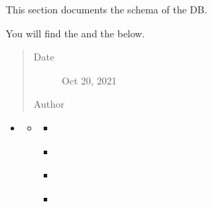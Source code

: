 \documentclass[letterpaper,10pt,english]{sphinxmanual}
\begin{document}
\begin{enumerate}
\begin{itemize}
\begin{sphinxShadowBox}
\sphinxAtStartPar
This section documents the schema of the DB.

\sphinxAtStartPar
You will find the {\hyperref[\detokenize{schema_tables:schema-definitions}]{}} and the {\hyperref[\detokenize{schema_tables:reference-tables}]{}} below.
\begin{quote}\begin{description}
\item[{Date}] \leavevmode
\sphinxAtStartPar
Oct 20, 2021

\item[{Author}] \leavevmode
\sphinxAtStartPar
{}

\end{description}\end{quote}
\end{sphinxShadowBox}

\begin{sphinxShadowBox}
\begin{itemize}
\item {} 
\sphinxAtStartPar
{}\label{\detokenize{schema_tables:id99}}{\hyperref[\detokenize{schema_tables:database-schema}]{}}
\begin{itemize}
\item {} 
\sphinxAtStartPar
{}\label{\detokenize{schema_tables:id100}}{\hyperref[\detokenize{schema_tables:schema-definitions}]{}}
\begin{itemize}
\item {} 
\sphinxAtStartPar
{}\label{\detokenize{schema_tables:id101}}{\hyperref[\detokenize{schema_tables:year}]{}}

\item {} 
\sphinxAtStartPar
{}\label{\detokenize{schema_tables:id102}}{\hyperref[\detokenize{schema_tables:aggressor-id}]{}}

\item {} 
\sphinxAtStartPar
{}\label{\detokenize{schema_tables:id103}}{\hyperref[\detokenize{schema_tables:aggressor-name}]{}}

\item {} 
\sphinxAtStartPar
{}\label{\detokenize{schema_tables:id104}}{\hyperref[\detokenize{schema_tables:victim-id}]{}}


\end{itemize}
\end{itemize}
\end{itemize}
\end{sphinxShadowBox}
\end{itemize}
\end{enumerate}
\end{document}
